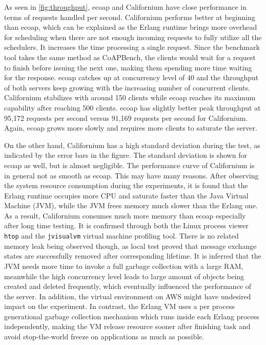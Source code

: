 As seen in \autoref{fig:throughput}, ecoap and Californium have close performance in terms of requests handled per second. Californium performs better at beginning than ecoap, which can be explained as the Erlang runtime brings more overhead for scheduling when there are not enough incoming requests to fully utilize all the schedulers. It increases the time processing a single request. Since the benchmark tool takes the same method as CoAPBench, the clients would wait for a request to finish before issuing the next one, making them spending more time waiting for the response. ecoap catches up at concurrency level of 40 and the throughput of both servers keep growing with the increasing number of concurrent clients. Californium stabilizes with around 150 clients while ecoap reaches its maximum capability after reaching 500 clients. ecoap has slightly better peak throughput at 95,172 requests per second versus 91,169 requests per second for Californium. Again, ecoap grows more slowly and requires more clients to saturate the server.

On the other hand, Californium has a high standard deviation during the test, as indicated by the error bars in the figure. The standard deviation is shown for ecoap as well, but is almost negligible. The performance curve of Californium is in general not as smooth as ecoap.
This may have many reasons. After observing the system resource consumption during the experiments, it is found that the Erlang runtime occupies more CPU and saturate faster than the Java Virtual Machine (JVM), while the JVM frees memory much slower than the Erlang one. As a result, Californium consumes much more memory than ecoap especially after long time testing. It is confirmed through both the Linux process viewer \verb|htop| and the \verb|jvisualvm| \cite{jvisualvm} virtual machine profiling tool. There is no related memory leak being observed though, as local test proved that message exchange states are successfully removed after corresponding lifetime. It is inferred that the JVM needs more time to invoke a full garbage collection with a large RAM, meanwhile the high concurrency level leads to large amount of objects being created and deleted frequently, which eventually influenced the performance of the server. In addition, the virtual environment on AWS might have undesired impact on the experiment. In contrast, the Erlang VM uses a per process generational garbage collection mechanism which runs inside each Erlang process independently, making the VM release resource sooner after finishing task and avoid stop-the-world freeze on applications as much as possible. 

